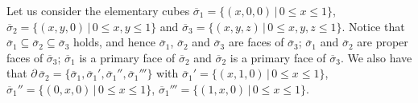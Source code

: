 \documentclass[journal]{IEEEtran}
\begin{document}
Let us consider the elementary cubes $\overline{\sigma}_1 = \{(x,0,0)\,|\, 0\leq
x \leq 1\}$, $\overline{\sigma}_2 = \{(x,y,0)\,|\, 0\leq x,y \leq 1\}$ and
$\overline{\sigma}_3 = \{(x,y,z)\,|\, 0\leq x,y,z \leq 1\}$. Notice that
$\overline{\sigma}_1\subseteq \overline{\sigma}_2 \subseteq \overline{\sigma}_3$
holds, and hence $\overline{\sigma}_1$, $\overline{\sigma}_2$ and
$\overline{\sigma}_3$ are faces of $\overline{\sigma}_3$; $\overline{\sigma}_1$
and $\overline{\sigma}_2$ are proper faces of $\overline{\sigma}_3$;
$\overline{\sigma}_1$ is a primary face of $\overline{\sigma}_2$ and
$\overline{\sigma}_2$ is a primary face of $\overline{\sigma}_3$. We also have
that $\partial\, \overline{\sigma}_2
=\{\overline{\sigma}_1,\overline{\sigma}_1',\overline{\sigma}_1'',\overline{\sigma}_1'''\}$
with $\overline{\sigma}_1' = \{(x,1,0)\,|\, 0\leq x \leq 1\}$,
$\overline{\sigma}_1'' = \{(0,x,0)\,|\, 0\leq x \leq 1\}$,
$\overline{\sigma}_1''' = \{(1,x,0)\,|\, 0\leq x \leq 1\}$.
\end{document}
